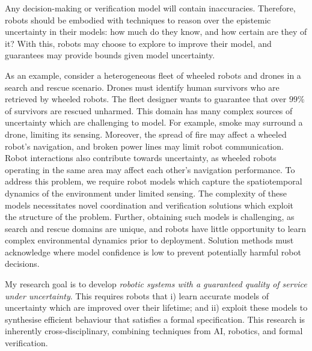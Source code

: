 \documentclass[12pt]{article}
\begin{document}

Any decision-making or verification model will contain inaccuracies.
%
Therefore, robots should be embodied with techniques to reason over the epistemic uncertainty in their models: how much do they know, and how certain are they of it?
%
With this, robots may choose to explore to improve their model, and guarantees may provide bounds given model uncertainty.

\fi

As an example, consider a heterogeneous fleet of wheeled robots and drones in a search and rescue scenario.
%
Drones must identify human survivors who are retrieved by wheeled robots.
%
The fleet designer wants to guarantee that over $99\%$ of survivors are rescued unharmed.
%
This domain has many complex sources of uncertainty which are challenging to model.
%
For example, smoke may surround a drone, limiting its sensing.
%
Moreover, the spread of fire may affect a wheeled robot's navigation, and broken power lines may limit robot communication. 
%
Robot interactions also contribute towards uncertainty, as wheeled robots operating in the same area may affect each other's navigation performance.
%
To address this problem, we require robot models which capture the spatiotemporal dynamics of the environment under limited sensing.
%
The complexity of these models necessitates novel coordination and verification solutions which exploit the structure of the problem.
%
Further, obtaining such models is challenging, as search and rescue domains are unique, and robots have little opportunity to learn complex environmental dynamics prior to deployment.
%
Solution methods must acknowledge where model confidence is low to prevent potentially harmful robot decisions.


My research goal is to develop \emph{robotic systems with a guaranteed quality of service under uncertainty}.
%
This requires robots that i) learn accurate models of uncertainty which are improved over their lifetime; and ii) exploit these models to synthesise efficient behaviour that satisfies a formal specification.
%
This research is inherently cross-disciplinary, combining techniques from AI, robotics, and formal verification.
\end{document}
